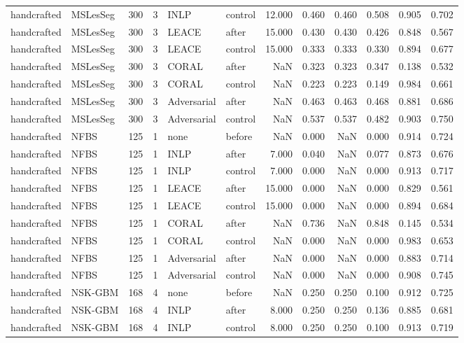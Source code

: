 \begin{tabular}{llrrllrrrrrr}
handcrafted & MSLesSeg & 300 & 3 & INLP & control & 12.000 & 0.460 & 0.460 & 0.508 & 0.905 & 0.702 \\
handcrafted & MSLesSeg & 300 & 3 & LEACE & after & 15.000 & 0.430 & 0.430 & 0.426 & 0.848 & 0.567 \\
handcrafted & MSLesSeg & 300 & 3 & LEACE & control & 15.000 & 0.333 & 0.333 & 0.330 & 0.894 & 0.677 \\
handcrafted & MSLesSeg & 300 & 3 & CORAL & after & NaN & 0.323 & 0.323 & 0.347 & 0.138 & 0.532 \\
handcrafted & MSLesSeg & 300 & 3 & CORAL & control & NaN & 0.223 & 0.223 & 0.149 & 0.984 & 0.661 \\
handcrafted & MSLesSeg & 300 & 3 & Adversarial & after & NaN & 0.463 & 0.463 & 0.468 & 0.881 & 0.686 \\
handcrafted & MSLesSeg & 300 & 3 & Adversarial & control & NaN & 0.537 & 0.537 & 0.482 & 0.903 & 0.750 \\
handcrafted & NFBS & 125 & 1 & none & before & NaN & 0.000 & NaN & 0.000 & 0.914 & 0.724 \\
handcrafted & NFBS & 125 & 1 & INLP & after & 7.000 & 0.040 & NaN & 0.077 & 0.873 & 0.676 \\
handcrafted & NFBS & 125 & 1 & INLP & control & 7.000 & 0.000 & NaN & 0.000 & 0.913 & 0.717 \\
handcrafted & NFBS & 125 & 1 & LEACE & after & 15.000 & 0.000 & NaN & 0.000 & 0.829 & 0.561 \\
handcrafted & NFBS & 125 & 1 & LEACE & control & 15.000 & 0.000 & NaN & 0.000 & 0.894 & 0.684 \\
handcrafted & NFBS & 125 & 1 & CORAL & after & NaN & 0.736 & NaN & 0.848 & 0.145 & 0.534 \\
handcrafted & NFBS & 125 & 1 & CORAL & control & NaN & 0.000 & NaN & 0.000 & 0.983 & 0.653 \\
handcrafted & NFBS & 125 & 1 & Adversarial & after & NaN & 0.000 & NaN & 0.000 & 0.883 & 0.714 \\
handcrafted & NFBS & 125 & 1 & Adversarial & control & NaN & 0.000 & NaN & 0.000 & 0.908 & 0.745 \\
handcrafted & NSK-GBM & 168 & 4 & none & before & NaN & 0.250 & 0.250 & 0.100 & 0.912 & 0.725 \\
handcrafted & NSK-GBM & 168 & 4 & INLP & after & 8.000 & 0.250 & 0.250 & 0.136 & 0.885 & 0.681 \\
handcrafted & NSK-GBM & 168 & 4 & INLP & control & 8.000 & 0.250 & 0.250 & 0.100 & 0.913 & 0.719 \\

\end{tabular}
